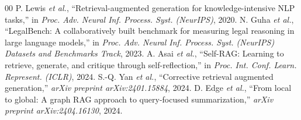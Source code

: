 \documentclass[conference]{IEEEtran}
\begin{document}
\balance

\begin{thebibliography}{00}
 P. Lewis \textit{et al.}, ``Retrieval-augmented generation for knowledge-intensive NLP tasks,'' in \textit{Proc. Adv. Neural Inf. Process. Syst. (NeurIPS)}, 2020.
 N. Guha \textit{et al.}, ``LegalBench: A collaboratively built benchmark for measuring legal reasoning in large language models,'' in \textit{Proc. Adv. Neural Inf. Process. Syst. (NeurIPS) Datasets and Benchmarks Track}, 2023.
 A. Asai \textit{et al.}, ``Self-RAG: Learning to retrieve, generate, and critique through self-reflection,'' in \textit{Proc. Int. Conf. Learn. Represent. (ICLR)}, 2024.
 S.-Q. Yan \textit{et al.}, ``Corrective retrieval augmented generation,'' \textit{arXiv preprint arXiv:2401.15884}, 2024.
 D. Edge \textit{et al.}, ``From local to global: A graph RAG approach to query-focused summarization,'' \textit{arXiv preprint arXiv:2404.16130}, 2024.
\end{thebibliography}
\end{document}
